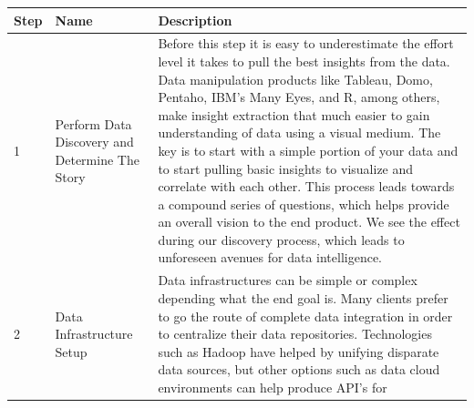 \documentclass[]{book}
\theoremstyle{definition}
\theoremstyle{definition}
\theoremstyle{definition}
\theoremstyle{remark}
\begin{document}
\begin{longtable}[]{@{}lll@{}}
\toprule
\begin{minipage}[b]{0.04\columnwidth}\raggedright\strut
\textbf{Step}\strut
\end{minipage} & \begin{minipage}[b]{0.11\columnwidth}\raggedright\strut
\textbf{Name}\strut
\end{minipage} & \begin{minipage}[b]{0.76\columnwidth}\raggedright\strut
\textbf{Description}\strut
\end{minipage}\tabularnewline
\midrule
\endhead
\begin{minipage}[t]{0.04\columnwidth}\raggedright\strut
1\strut
\end{minipage} & \begin{minipage}[t]{0.11\columnwidth}\raggedright\strut
Perform Data Discovery and Determine The Story\strut
\end{minipage} & \begin{minipage}[t]{0.76\columnwidth}\raggedright\strut
Before this step it is easy to underestimate the effort level it takes
to pull the best insights from the data. Data manipulation products like
Tableau, Domo, Pentaho, IBM's Many Eyes, and R, among others, make
insight extraction that much easier to gain understanding of data using
a visual medium. The key is to start with a simple portion of your data
and to start pulling basic insights to visualize and correlate with each
other. This process leads towards a compound series of questions, which
helps provide an overall vision to the end product. We see the effect
during our discovery process, which leads to unforeseen avenues for data
intelligence.\strut
\end{minipage}\tabularnewline
\begin{minipage}[t]{0.04\columnwidth}\raggedright\strut
2\strut
\end{minipage} & \begin{minipage}[t]{0.11\columnwidth}\raggedright\strut
Data Infrastructure Setup\strut
\end{minipage} & \begin{minipage}[t]{0.76\columnwidth}\raggedright\strut
Data infrastructures can be simple or complex depending what the end
goal is. Many clients prefer to go the route of complete data
integration in order to centralize their data repositories. Technologies
such as Hadoop have helped by unifying disparate data sources, but other
options such as data cloud environments can help produce API's for

\end{minipage}
\end{longtable}
\end{document}
